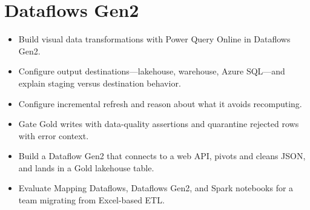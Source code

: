 \chapter{Dataflows Gen2}
%

\begin{objectives}
\begin{itemize}
    \item Build visual data transformations with Power Query Online in Dataflows Gen2.
    \item Configure output destinations---lakehouse, warehouse, Azure SQL---and explain staging versus destination behavior.
    \item Configure incremental refresh and reason about what it avoids recomputing.
    \item Gate Gold writes with data-quality assertions and quarantine rejected rows with error context.
    \item Build a Dataflow Gen2 that connects to a web API, pivots and cleans JSON, and lands in a Gold lakehouse table.
    \item Evaluate Mapping Dataflows, Dataflows Gen2, and Spark notebooks for a team migrating from Excel-based ETL.
\end{itemize}
\end{objectives}

